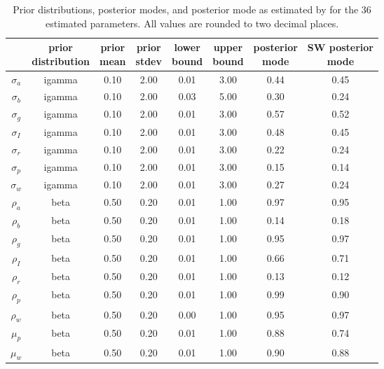 \documentclass[11pt]{article}
\begin{document}
\begin{table}

\caption{\label{tab:parameter-estimate-table}Prior distributions, posterior modes, and posterior mode as
      estimated by \citet{SmetsWouters2007} for the 36 estimated
      parameters. All values are rounded to two decimal places.}
\centering
\fontsize{9}{11}\selectfont
\begin{tabular}[t]{cccccccc}
\toprule
 & \makecell[c]{prior\\distribution} & \makecell[c]{prior\\mean} & \makecell[c]{prior\\stdev} & \makecell[c]{lower\\bound} & \makecell[c]{upper\\bound} & \makecell[c]{posterior\\mode} & \makecell[c]{SW posterior\\mode}\\
\midrule
$\sigma_a$ & igamma & 0.10 & 2.00 & 0.01 & 3.00 & 0.44 & 0.45\\
$\sigma_b$ & igamma & 0.10 & 2.00 & 0.03 & 5.00 & 0.30 & 0.24\\
$\sigma_g$ & igamma & 0.10 & 2.00 & 0.01 & 3.00 & 0.57 & 0.52\\
$\sigma_I$ & igamma & 0.10 & 2.00 & 0.01 & 3.00 & 0.48 & 0.45\\
$\sigma_r$ & igamma & 0.10 & 2.00 & 0.01 & 3.00 & 0.22 & 0.24\\
\addlinespace
$\sigma_p$ & igamma & 0.10 & 2.00 & 0.01 & 3.00 & 0.15 & 0.14\\
$\sigma_w$ & igamma & 0.10 & 2.00 & 0.01 & 3.00 & 0.27 & 0.24\\
$\rho_a$ & beta & 0.50 & 0.20 & 0.01 & 1.00 & 0.97 & 0.95\\
$\rho_b$ & beta & 0.50 & 0.20 & 0.01 & 1.00 & 0.14 & 0.18\\
$\rho_g$ & beta & 0.50 & 0.20 & 0.01 & 1.00 & 0.95 & 0.97\\
\addlinespace
$\rho_I$ & beta & 0.50 & 0.20 & 0.01 & 1.00 & 0.66 & 0.71\\
$\rho_r$ & beta & 0.50 & 0.20 & 0.01 & 1.00 & 0.13 & 0.12\\
$\rho_p$ & beta & 0.50 & 0.20 & 0.01 & 1.00 & 0.99 & 0.90\\
$\rho_w$ & beta & 0.50 & 0.20 & 0.00 & 1.00 & 0.95 & 0.97\\
$\mu_p$ & beta & 0.50 & 0.20 & 0.01 & 1.00 & 0.88 & 0.74\\
\addlinespace
$\mu_w$ & beta & 0.50 & 0.20 & 0.01 & 1.00 & 0.90 & 0.88\\

\end{tabular}
\end{table}
\end{document}
